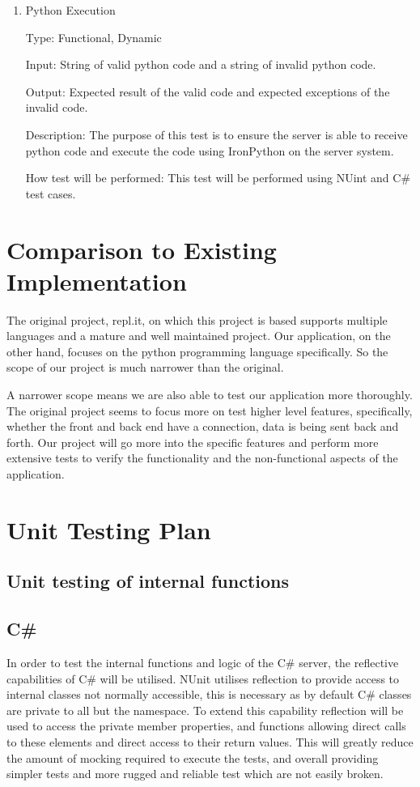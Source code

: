 \documentclass[12pt, titlepage]{article}
\begin{document}
\begin{enumerate}
\begin{enumerate}
\item{Python Execution\\}

Type: Functional, Dynamic

Input: String of valid python code and a string of invalid python code.

Output: Expected result of the valid code and expected exceptions of the
    invalid code.
					
Description: The purpose of this test is to ensure the server is able to
receive python code and execute the code using IronPython on the server system.
					
How test will be performed: This test will be performed using NUint and C\#
test cases.
					
\end{enumerate}
	
\section{Comparison to Existing Implementation}	
The original project, repl.it, on which this project is based supports multiple
languages and a mature and well maintained project. Our application, on the
other hand, focuses on the python programming language specifically. So the
scope of our project is much narrower than the original.

A narrower scope means we are also able to test our application more thoroughly.
The original project seems to focus more on test higher level features,
specifically, whether the front and back end have a connection, data is being
sent back and forth. Our project will go more into the specific features and
perform more extensive tests to verify the functionality and the non-functional
aspects of the application.

				
\section{Unit Testing Plan}
		
\subsection{Unit testing of internal functions}

\subsection{C\#}
In order to test the internal functions and logic of the C\# server, the
reflective capabilities of C\# will be utilised. NUnit utilises reflection to
provide access to internal classes not normally accessible, this is necessary
as by default C\# classes are private to all but the namespace. To extend this
capability reflection will be used to access the private member properties, and
functions allowing direct calls to these elements and direct access to their
return values. This will greatly reduce the amount of mocking required to
execute the tests, and overall providing simpler tests and more rugged and
reliable test which are not easily broken. 


\end{enumerate}
\end{document}
